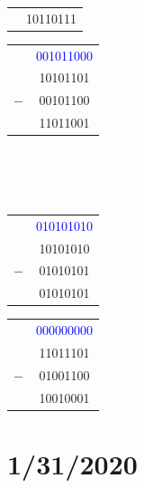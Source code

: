 \documentclass[10pt,a4paper]{article}
\begin{document}
\begin{itemize}
\begin{tabular}{cc}
\hline
 & 10110111\\
\end{tabular}\hspace{.5cm}
\begin{tabular}{cc}
  & \textcolor{blue}{001011000}\\
  & 10101101\\
$-$ & 00101100\\
\hline
 & 11011001\\
\end{tabular}\\~\\~\\
\begin{tabular}{cc}
  & \textcolor{blue}{010101010}\\
  & 10101010\\
$-$ & 01010101\\
\hline
 & 01010101\\
\end{tabular}\hspace{.5cm}
\begin{tabular}{cc}
  & \textcolor{blue}{000000000}\\
  & 11011101\\
$-$ & 01001100\\
\hline
 & 10010001\\
\end{tabular}
\end{itemize}\pagebreak
\section{1/31/2020}
\end{document}

